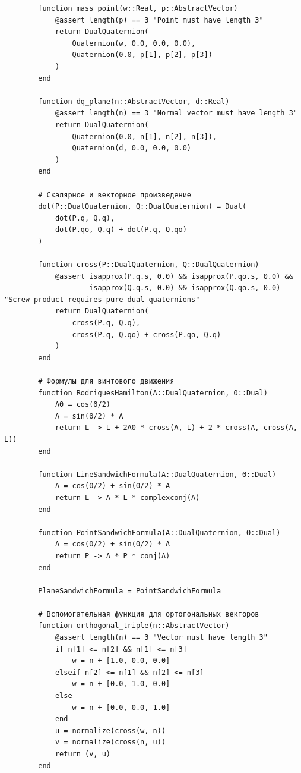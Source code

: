 \begin{verbatim}
        function mass_point(w::Real, p::AbstractVector)
            @assert length(p) == 3 "Point must have length 3"
            return DualQuaternion(
                Quaternion(w, 0.0, 0.0, 0.0),
                Quaternion(0.0, p[1], p[2], p[3])
            )
        end

        function dq_plane(n::AbstractVector, d::Real)
            @assert length(n) == 3 "Normal vector must have length 3"
            return DualQuaternion(
                Quaternion(0.0, n[1], n[2], n[3]),
                Quaternion(d, 0.0, 0.0, 0.0)
            )
        end

        # Скалярное и векторное произведение
        dot(P::DualQuaternion, Q::DualQuaternion) = Dual(
            dot(P.q, Q.q),
            dot(P.qo, Q.q) + dot(P.q, Q.qo)
        )

        function cross(P::DualQuaternion, Q::DualQuaternion)
            @assert isapprox(P.q.s, 0.0) && isapprox(P.qo.s, 0.0) &&
                    isapprox(Q.q.s, 0.0) && isapprox(Q.qo.s, 0.0) "Screw product requires pure dual quaternions"
            return DualQuaternion(
                cross(P.q, Q.q),
                cross(P.q, Q.qo) + cross(P.qo, Q.q)
            )
        end

        # Формулы для винтового движения
        function RodriguesHamilton(A::DualQuaternion, Θ::Dual)
            Λ0 = cos(Θ/2)
            Λ = sin(Θ/2) * A
            return L -> L + 2Λ0 * cross(Λ, L) + 2 * cross(Λ, cross(Λ, L))
        end

        function LineSandwichFormula(A::DualQuaternion, Θ::Dual)
            Λ = cos(Θ/2) + sin(Θ/2) * A
            return L -> Λ * L * complexconj(Λ)
        end

        function PointSandwichFormula(A::DualQuaternion, Θ::Dual)
            Λ = cos(Θ/2) + sin(Θ/2) * A
            return P -> Λ * P * conj(Λ)
        end

        PlaneSandwichFormula = PointSandwichFormula

        # Вспомогательная функция для ортогональных векторов
        function orthogonal_triple(n::AbstractVector)
            @assert length(n) == 3 "Vector must have length 3"
            if n[1] <= n[2] && n[1] <= n[3]
                w = n + [1.0, 0.0, 0.0]
            elseif n[2] <= n[1] && n[2] <= n[3]
                w = n + [0.0, 1.0, 0.0]
            else
                w = n + [0.0, 0.0, 1.0]
            end
            u = normalize(cross(w, n))
            v = normalize(cross(n, u))
            return (v, u)
        end


\end{verbatim}
